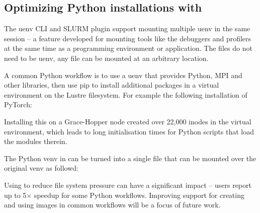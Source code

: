 \subsection{Optimizing Python installations with \squashfs}
\label{sec:usecase-squashfs}

The uenv CLI and SLURM plugin support mounting multiple uenv in the same session -- a feature developed for mounting tools like the debuggers and profilers at the same time as a programming environment or application.
The \squashfs files do not need to be uenv, any \squashfs file can be mounted at an arbitrary location.

A common Python workflow is to use a uenv that provides Python, MPI and other libraries, then use pip to install additional packages in a virtual environment on the Lustre filesystem.
For example the following installation of PyTorch:

Installing this on a Grace-Hopper node created over 22,000 inodes in the virtual environment, which leads to long initialisation times for Python scripts that load the modules therein.

The Python venv in  can be turned into a single \squashfs file that can be mounted over the original venv as followd:


Using \squashfs to reduce file system pressure can have a significant impact -- users report up to 5$\times$ speedup for some Python workflows.
Improving support for creating and using \squashfs images in common workflows will be a focus of future work.

